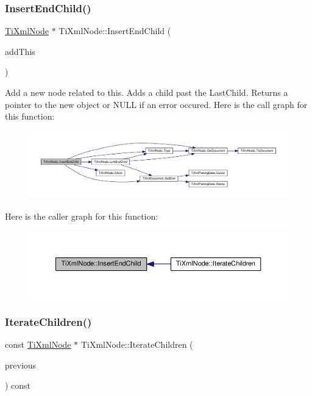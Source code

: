 \subsubsection{\texorpdfstring{Insert\+End\+Child()}{InsertEndChild()}}
{\footnotesize\ttfamily \hyperlink{class_ti_xml_node}{Ti\+Xml\+Node} $\ast$ Ti\+Xml\+Node\+::\+Insert\+End\+Child (\begin{DoxyParamCaption}\item[{const \hyperlink{class_ti_xml_node}{Ti\+Xml\+Node} \&}]{add\+This }\end{DoxyParamCaption})}

Add a new node related to this. Adds a child past the Last\+Child. Returns a pointer to the new object or N\+U\+LL if an error occured. Here is the call graph for this function\+:
\nopagebreak
\begin{figure}[H]
\begin{center}
\leavevmode
\includegraphics[width=350pt]{class_ti_xml_node_af287a913ce46d8dbf7ef24fec69bbaf0_cgraph}
\end{center}
\end{figure}
Here is the caller graph for this function\+:
\nopagebreak
\begin{figure}[H]
\begin{center}
\leavevmode
\includegraphics[width=350pt]{class_ti_xml_node_af287a913ce46d8dbf7ef24fec69bbaf0_icgraph}
\end{center}
\end{figure}
\mbox{\label{class_ti_xml_node_a67c3a02b797f08d9a31b2553661257e1}} 
\subsubsection{\texorpdfstring{Iterate\+Children()}{IterateChildren()}\hspace{0.1cm}{\footnotesize\ttfamily [1/4]}}
{\footnotesize\ttfamily const \hyperlink{class_ti_xml_node}{Ti\+Xml\+Node} $\ast$ Ti\+Xml\+Node\+::\+Iterate\+Children (\begin{DoxyParamCaption}\item[{const \hyperlink{class_ti_xml_node}{Ti\+Xml\+Node} $\ast$}]{previous }\end{DoxyParamCaption}) const}

